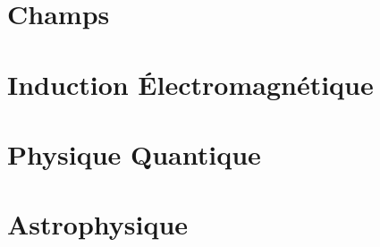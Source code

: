\documentclass[french, a4paper, 12pt]{article}
\begin{document}
\section{Champs}
%
\pagebreak

\section{Induction Électromagnétique}
\pagebreak

\section{Physique Quantique}
\pagebreak

\section{Astrophysique}
\end{document}
